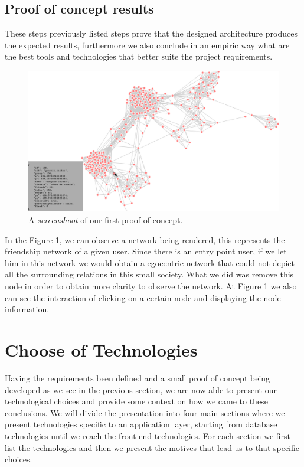 \subsection{Proof of concept results}
\indent These steps previously listed steps prove that the designed architecture produces the expected results, furthermore we also conclude in an empiric way what are
the best tools and technologies that better suite the project requirements.\\

\begin{figure}[h!]
\begin{center}
  \hspace*{-0.8in}
  \includegraphics[width=1.2\textwidth]{img/proof-of-concept.png}
\end{center}
\caption{\label{img:poc} A \textit{screenshoot} of our first proof of concept.}
\end{figure}

\indent In the Figure \ref{img:poc}, we can observe a network being rendered, this represents the friendship network of a given user. Since there is an entry point user, if we let him in this network we would obtain a egocentric network that could not depict all the surrounding relations in this small society. What we did was remove this node in order to obtain more clarity to observe the network. At Figure \ref{img:poc} we also can see the interaction of clicking on a certain node and displaying the node information.

\section{Choose of Technologies}
Having the requirements been defined and a small proof of concept being developed as we see in the previous section, we are now able to present our technological choices and provide some context on how we came to these conclusions. We will divide the presentation into four main sections where we present technologies specific to an application layer, starting from database technologies until we reach the front end technologies. For each section we first list the technologies and then we present the motives that lead us to that specific choices.

